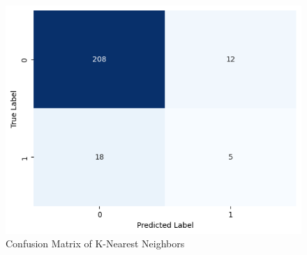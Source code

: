 \begin{figure}[H]
    \centering
    \includegraphics[width=\linewidth]{figures/kn_confu.png}
    \caption{Confusion Matrix of K-Nearest Neighbors}
    \label{fig:tts cv}
\end{figure}
